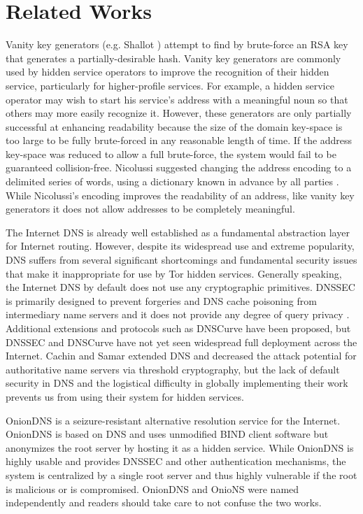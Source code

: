 \documentclass[USenglish,oneside,twocolumn]{article}
\begin{document}
\section{Related Works}
\label{sec:RelatedWorks}

Vanity key generators (e.g. Shallot \cite{KatmagicShallot}) attempt to find by brute-force an RSA key that generates a partially-desirable hash. Vanity key generators are commonly used by hidden service operators to improve the recognition of their hidden service, particularly for higher-profile services. For example, a hidden service operator may wish to start his service's address with a meaningful noun so that others may more easily recognize it. However, these generators are only partially successful at enhancing readability because the size of the domain key-space is too large to be fully brute-forced in any reasonable length of time. If the address key-space was reduced to allow a full brute-force, the system would fail to be guaranteed collision-free. Nicolussi suggested changing the address encoding to a delimited series of words, using a dictionary known in advance by all parties \cite{nicolussi2011human}. While Nicolussi's encoding improves the readability of an address, like vanity key generators it does not allow addresses to be completely meaningful.

The Internet DNS is already well established as a fundamental abstraction layer for Internet routing. However, despite its widespread use and extreme popularity, DNS suffers from several significant shortcomings and fundamental security issues that make it inappropriate for use by Tor hidden services. Generally speaking, the Internet DNS by default does not use any cryptographic primitives. DNSSEC is primarily designed to prevent forgeries and DNS cache poisoning from intermediary name servers and it does not provide any degree of query privacy \cite{wachs2014censorship}. Additional extensions and protocols such as DNSCurve \cite{bernstein2009dnscurve} have been proposed, but DNSSEC and DNSCurve have not yet seen widespread full deployment across the Internet. Cachin and Samar \cite{cachin2004secure} extended DNS and decreased the attack potential for authoritative name servers via threshold cryptography, but the lack of default security in DNS and the logistical difficulty in globally implementing their work prevents us from using their system for hidden services.

OnionDNS \cite{scaife2015oniondns} is a seizure-resistant alternative resolution service for the Internet. OnionDNS is based on DNS and uses unmodified BIND client software but anonymizes the root server by hosting it as a hidden service. While OnionDNS is highly usable and provides DNSSEC and other authentication mechanisms, the system is centralized by a single root server and thus highly vulnerable if the root is malicious or is compromised. OnionDNS and OnioNS were named independently and readers should take care to not confuse the two works.
\end{document}
